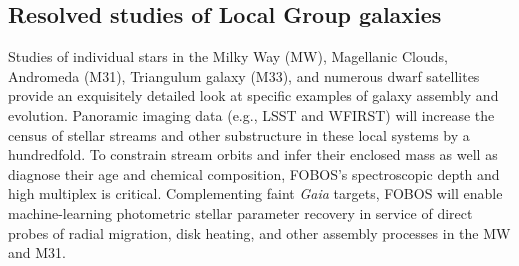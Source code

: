 
\subsection{Resolved studies of Local Group galaxies}
\label{sec:localgroup}

Studies of individual stars in the Milky Way (MW), Magellanic Clouds, Andromeda (M31), Triangulum galaxy (M33), and
numerous dwarf satellites provide an exquisitely detailed look at specific examples of galaxy assembly and evolution.
Panoramic imaging data (e.g., LSST and WFIRST) will increase the census of stellar streams and other substructure in
these local systems by a hundredfold.  To constrain stream orbits and infer their enclosed mass
\citep{2017ApJ...836..234S} as well as diagnose their age and chemical composition, FOBOS's spectroscopic depth and
high multiplex is critical.  Complementing faint {\it Gaia} targets, FOBOS will enable machine-learning photometric
stellar parameter recovery \citep[see Section \ref{sec:datascience};][]{2015ApJ...808...16N, 2018arXiv180401530T,
2018arXiv180803278T} in service of direct probes of radial migration, disk heating, and other assembly processes in the MW and M31.  




